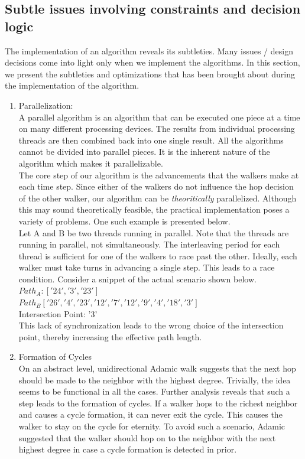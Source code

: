 \documentclass[a4paper,12pt]{article}
\begin{document}
\subsection{Subtle issues involving constraints and decision logic}
The implementation of an algorithm reveals its subtleties. Many issues / design decisions come into light only when we implement the algorithms. In this section, we present the subtleties and optimizations that has been brought about during the implementation of the algorithm.
\begin{enumerate}
\item Parallelization: \\
A parallel algorithm is an algorithm that can be executed one piece at a time on many different processing devices. The results from individual processing threads are then combined back into one single result. All the algorithms cannot be divided into parallel pieces. It is the inherent nature of the algorithm which makes it parallelizable.\\

The core step of our algorithm is the advancements that the walkers make at each time step. Since either of the walkers do not influence the hop decision of the other walker, our algorithm can be \emph{theoritically} parallelized. Although this may sound theoretically feasible, the practical implementation poses a variety of problems. One such example is presented below.\\

Let A and B be two threads running in parallel. Note that the threads are running in parallel, not simultaneously. The interleaving period for each thread is sufficient for one of the walkers to race past the other. Ideally, each walker must take turns in advancing a single step. This leads to a race condition. Consider a snippet of the actual scenario shown below. \\
$Path_A: ['24', '3', '23']$\\
$Path_B ['26', '4', '23', '12', '7', '12', '9', '4', '18', '3']$\\
Intersection Point: '3'\\
This lack of synchronization leads to the wrong choice of the intersection point, thereby increasing the effective path length.

\item Formation of Cycles\\
On an abstract level, unidirectional Adamic walk suggests that the next hop should be made to the neighbor with the highest degree. Trivially, the idea seems to be functional in all the cases. Further analysis reveals that such a step leads to the formation of cycles. If a walker hops to the richest neighbor and causes a cycle formation, it can never exit the cycle. This causes the walker to stay on the cycle for eternity. To avoid such a scenario, Adamic suggested that the walker should hop on to the neighbor with the next highest degree in case a cycle formation is detected in prior.\\


\end{enumerate}
\end{document}
